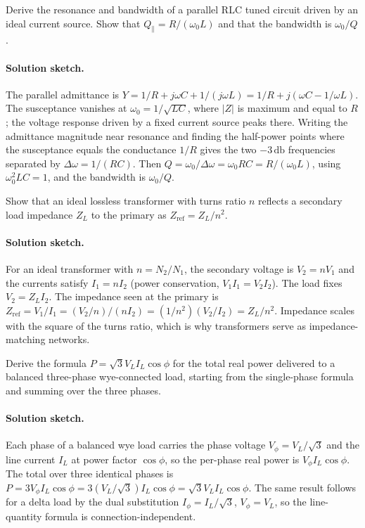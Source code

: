 \begin{exercise}
Derive the resonance and bandwidth of a parallel RLC tuned circuit
driven by an ideal current source. Show that $Q_{\parallel} =
R/(\omega_{0}L)$ and that the bandwidth is $\omega_{0}/Q$.
\paragraph{Solution sketch.}
The parallel admittance is $Y = 1/R + j\omega C + 1/(j\omega L) = 1/R +
j(\omega C - 1/\omega L)$. The susceptance vanishes at $\omega_{0} =
1/\sqrt{LC}$, where $|Z|$ is maximum and equal to $R$; the voltage
response driven by a fixed current source peaks there. Writing the
admittance magnitude near resonance and finding the half-power points
where the susceptance equals the conductance $1/R$ gives the two
$-3\,\si{\decibel}$ frequencies separated by $\Delta\omega = 1/(RC)$.
Then $Q = \omega_{0}/\Delta\omega = \omega_{0}RC = R/(\omega_{0}L)$,
using $\omega_{0}^{2}LC = 1$, and the bandwidth is $\omega_{0}/Q$.
\end{exercise}

\begin{exercise}
Show that an ideal lossless transformer with turns ratio $n$ reflects
a secondary load impedance $Z_{L}$ to the primary as $Z_{\text{ref}}
= Z_{L}/n^{2}$.
\paragraph{Solution sketch.}
For an ideal transformer with $n = N_{2}/N_{1}$, the secondary voltage
is $V_{2} = nV_{1}$ and the currents satisfy $I_{1} = nI_{2}$ (power
conservation, $V_{1}I_{1} = V_{2}I_{2}$). The load fixes $V_{2} =
Z_{L}I_{2}$. The impedance seen at the primary is $Z_{\text{ref}} =
V_{1}/I_{1} = (V_{2}/n)/(nI_{2}) = (1/n^{2})(V_{2}/I_{2}) = Z_{L}/n^{2}$.
Impedance scales with the square of the turns ratio, which is why
transformers serve as impedance-matching networks.
\end{exercise}

\begin{exercise}
Derive the formula $P = \sqrt{3}V_{L}I_{L}\cos\phi$ for the total
real power delivered to a balanced three-phase wye-connected load,
starting from the single-phase formula and summing over the three
phases.
\paragraph{Solution sketch.}
Each phase of a balanced wye load carries the phase voltage
$V_{\phi} = V_{L}/\sqrt{3}$ and the line current $I_{L}$ at power
factor $\cos\phi$, so the per-phase real power is $V_{\phi}I_{L}\cos\phi$.
The total over three identical phases is $P = 3V_{\phi}I_{L}\cos\phi =
3(V_{L}/\sqrt{3})I_{L}\cos\phi = \sqrt{3}V_{L}I_{L}\cos\phi$. The same
result follows for a delta load by the dual substitution
$I_{\phi} = I_{L}/\sqrt{3}$, $V_{\phi} = V_{L}$, so the line-quantity
formula is connection-independent.
\end{exercise}

